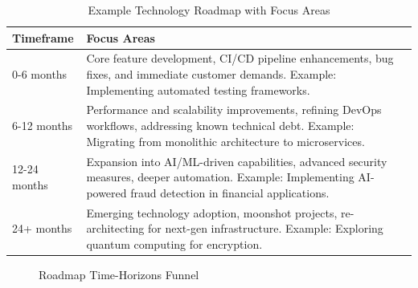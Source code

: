 \begin{table}[h]
    \centering
    \begin{tabular}{|l|p{10cm}|}
        \hline
        \textbf{Timeframe} & \textbf{Focus Areas}                                                                                                                                                    \\
        \hline
        0-6 months         & Core feature development, CI/CD pipeline enhancements, bug fixes, and immediate customer demands. Example: Implementing automated testing frameworks.                   \\
        6-12 months        & Performance and scalability improvements, refining DevOps workflows, addressing known technical debt. Example: Migrating from monolithic architecture to microservices. \\
        12-24 months       & Expansion into AI/ML-driven capabilities, advanced security measures, deeper automation. Example: Implementing AI-powered fraud detection in financial applications.    \\
        24+ months         & Emerging technology adoption, moonshot projects, re-architecting for next-gen infrastructure. Example: Exploring quantum computing for encryption.                      \\
        \hline
    \end{tabular}
    \caption{Example Technology Roadmap with Focus Areas}
\end{table}

\begin{figure}[h]
    \centering
    \caption{Roadmap Time-Horizons Funnel}
    \label{fig:roadmap_funnel}
\end{figure}

